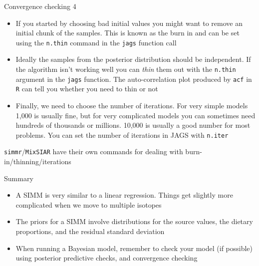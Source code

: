 \documentclass[
  ignorenonframetext,
  aspectratio=169]{beamer}
\providecommand{\tightlist}{%
  \setlength{\itemsep}{0pt}\setlength{\parskip}{0pt}}
\begin{document}
\begin{frame}[fragile]{Convergence checking 4}
\protect\hypertarget{convergence-checking-4}{}
\begin{itemize}
\tightlist
\item
  If you started by choosing bad initial values you might want to remove
  an initial chunk of the samples. This is known as the burn in and can
  be set using the \texttt{n.thin} command in the \texttt{jags} function
  call
\item
  Ideally the samples from the posterior distribution should be
  independent. If the algorithm isn't working well you can \emph{thin}
  them out with the \texttt{n.thin} argument in the \texttt{jags}
  function. The auto-correlation plot produced by \texttt{acf} in
  \texttt{R} can tell you whether you need to thin or not
\item
  Finally, we need to choose the number of iterations. For very simple
  models 1,000 is usually fine, but for very complicated models you can
  sometimes need hundreds of thousands or millions. 10,000 is usually a
  good number for most problems. You can set the number of iterations in
  JAGS with \texttt{n.iter}
\end{itemize}

\texttt{simmr}/\texttt{MixSIAR} have their own commands for dealing with
burn-in/thinning/iterations
\end{frame}

\begin{frame}{Summary}
\protect\hypertarget{summary}{}
\begin{itemize}
\tightlist
\item
  A SIMM is very similar to a linear regression. Things get slightly
  more complicated when we move to multiple isotopes
\item
  The priors for a SIMM involve distributions for the source values, the
  dietary proportions, and the residual standard deviation
\item
  When running a Bayesian model, remember to check your model (if
  possible) using posterior predictive checks, and convergence checking
\end{itemize}
\end{frame}
\end{document}
